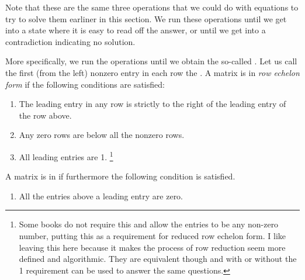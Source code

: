 \documentclass{ximera}
\begin{document}
Note that these are the same three operations that we could do with equations to try to solve them earliner in this section. We run these operations until we get into a state where it is easy to read off the answer, or until we get into a contradiction indicating no solution.

More specifically, we run the operations until we obtain the so-called \emph{}. Let us call the first (from the left) nonzero entry in each row the \emph{}. A matrix is in \emph{row echelon form} if the following conditions are satisfied:
\begin{enumerate}
    \item The leading entry in any row is strictly to the right of the leading entry of the row above.
    \item Any zero rows are below all the nonzero rows.
    \item All leading entries are 1.%
    \footnote{Some books do not require this and allow the entries to be any non-zero number, putting this as a requirement for reduced row echelon form. I like leaving this here because it makes the process of row reduction seem more defined and algorithmic. They are equivalent though and with or without the 1 requirement can be used to answer the same questions.}
\end{enumerate}
A matrix is in \emph{} if furthermore the following condition is satisfied.
\begin{enumerate}
    \item All the entries above a leading entry are zero.
\end{enumerate}
\end{document}
